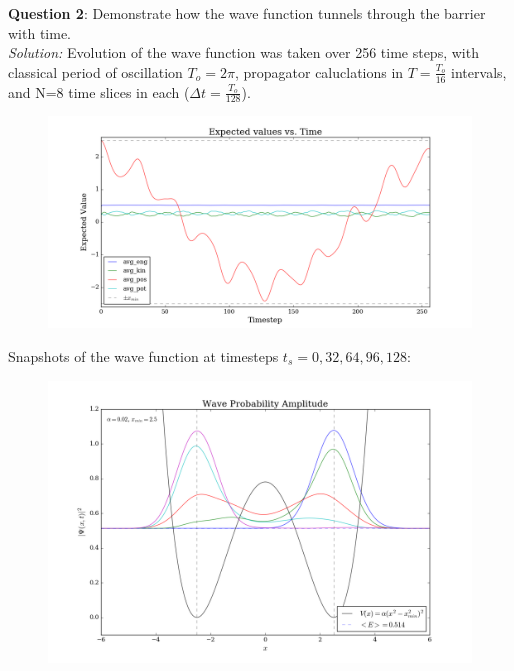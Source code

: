 \documentclass{article}
\begin{document}
\bigskip
\textbf{Question 2}: Demonstrate how the wave function tunnels through the barrier with time. \\

\textit{Solution:} Evolution of the wave function was taken over 256 time steps, with classical period of oscillation $T_o=2\pi$, propagator caluclations in $T=\frac{T_o}{16}$ intervals, and N=8 time slices in each ($\Delta t=\frac{T_o}{128}$).
\begin{figure}[H]
\begin{center}
\includegraphics[width=16cm]{plots/expected.png} 
\end{center}
\end{figure}

Snapshots of the wave function at timesteps $t_s=0, 32, 64, 96, 128$:
\begin{figure}[H]
\begin{center}
\includegraphics[width=16cm]{plots/period_sample.png}
\end{center}
\end{figure}
\end{document}
